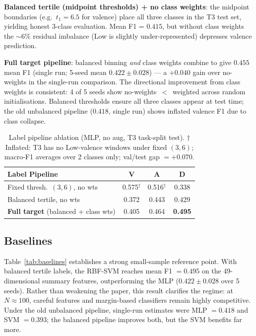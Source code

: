 \documentclass[sigconf,review,anonymous]{acmart}
\begin{document}
\textbf{Balanced tertile (midpoint thresholds) + no class weights}:
the midpoint boundaries (e.g.\ $t_1 = 6.5$ for valence) place all three
classes in the T3 test set, yielding honest 3-class evaluation.
Mean F1 = $0.415$, but without class weights the $\sim\!6\%$ residual
imbalance (Low is slightly under-represented) depresses valence prediction.

\textbf{Full target pipeline}: balanced binning \emph{and} class weights
combine to give $0.455$ mean F1 (single run; 5-seed mean $0.422 \pm 0.028$)
--- a $+0.040$ gain over no-weights in the single-run comparison.
The directional improvement from class weights is consistent:
4 of 5 seeds show no-weights~$<$~weighted across random initialisations.
Balanced thresholds ensure all three classes appear at test time;
the old unbalanced pipeline ($0.418$, single run) shows inflated valence
F1 due to class collapse.

\begin{table}[t]
\caption{Label pipeline ablation (MLP, no aug, T3 task-split test).
  $\dagger$Inflated: T3 has no Low-valence windows under fixed $(3,6)$;
  macro-F1 averages over 2 classes only; val/test gap $= {+}0.070$.}
\label{tab:label_ablation}
\centering
\setlength{\tabcolsep}{3pt}
\small
\begin{tabular}{lccc}
\toprule
\textbf{Label Pipeline} & \textbf{V} & \textbf{A} & \textbf{D} \\
\midrule
Fixed thresh.\ $(3,6)$, no wts  & 0.575$^\dagger$ & 0.516$^\dagger$ & 0.338 \\
Balanced tertile, no wts        & 0.372 & 0.443 & 0.429 \\
\textbf{Full target} (balanced + class wts) & 0.405 & 0.464 & \textbf{0.495} \\
\bottomrule
\end{tabular}
\end{table}

\subsection{Baselines}

Table~\ref{tab:baselines} establishes a strong small-sample reference point.
With balanced tertile labels, the RBF-SVM reaches mean F1 $= 0.495$ on the
49-dimensional summary features, outperforming the MLP
($0.422 \pm 0.028$ over 5 seeds).
Rather than weakening the paper, this result clarifies the regime:
at $N \approx 100$, careful features and margin-based classifiers remain
highly competitive.
Under the old unbalanced pipeline, single-run estimates were
MLP $= 0.418$ and SVM $= 0.393$; the balanced pipeline improves both,
but the SVM benefits far more.
\end{document}
